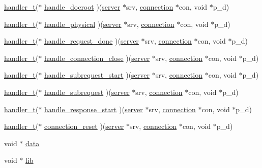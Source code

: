 \begin{DoxyCompactItemize}
\item 
\hyperlink{settings_8h_a2a8ffc3e29980db202f39ab85ab7e98e}{handler\-\_\-t}($\ast$ \hyperlink{structplugin_ac6e9dddb37aca959bd90651e949d5f4d}{handle\-\_\-docroot} )(\hyperlink{structserver}{server} $\ast$srv, \hyperlink{structconnection}{connection} $\ast$con, void $\ast$p\-\_\-d)
\item 
\hyperlink{settings_8h_a2a8ffc3e29980db202f39ab85ab7e98e}{handler\-\_\-t}($\ast$ \hyperlink{structplugin_ae5818db20f5d464df84a4c8bf4354567}{handle\-\_\-physical} )(\hyperlink{structserver}{server} $\ast$srv, \hyperlink{structconnection}{connection} $\ast$con, void $\ast$p\-\_\-d)
\item 
\hyperlink{settings_8h_a2a8ffc3e29980db202f39ab85ab7e98e}{handler\-\_\-t}($\ast$ \hyperlink{structplugin_af9d117621289c84a7cb0d705dbc9f47b}{handle\-\_\-request\-\_\-done} )(\hyperlink{structserver}{server} $\ast$srv, \hyperlink{structconnection}{connection} $\ast$con, void $\ast$p\-\_\-d)
\item 
\hyperlink{settings_8h_a2a8ffc3e29980db202f39ab85ab7e98e}{handler\-\_\-t}($\ast$ \hyperlink{structplugin_ab59fbc651a4308ac4e89ed27d1d33a00}{handle\-\_\-connection\-\_\-close} )(\hyperlink{structserver}{server} $\ast$srv, \hyperlink{structconnection}{connection} $\ast$con, void $\ast$p\-\_\-d)
\item 
\hyperlink{settings_8h_a2a8ffc3e29980db202f39ab85ab7e98e}{handler\-\_\-t}($\ast$ \hyperlink{structplugin_ae99ea16bdd683b294f3017490fd1e63f}{handle\-\_\-subrequest\-\_\-start} )(\hyperlink{structserver}{server} $\ast$srv, \hyperlink{structconnection}{connection} $\ast$con, void $\ast$p\-\_\-d)
\item 
\hyperlink{settings_8h_a2a8ffc3e29980db202f39ab85ab7e98e}{handler\-\_\-t}($\ast$ \hyperlink{structplugin_abf5ea22c50c0dc4ef11047565fbfc9a5}{handle\-\_\-subrequest} )(\hyperlink{structserver}{server} $\ast$srv, \hyperlink{structconnection}{connection} $\ast$con, void $\ast$p\-\_\-d)
\item 
\hyperlink{settings_8h_a2a8ffc3e29980db202f39ab85ab7e98e}{handler\-\_\-t}($\ast$ \hyperlink{structplugin_a2a517137ba9b9e231e97cceef3f41d5e}{handle\-\_\-response\-\_\-start} )(\hyperlink{structserver}{server} $\ast$srv, \hyperlink{structconnection}{connection} $\ast$con, void $\ast$p\-\_\-d)
\item 
\hyperlink{settings_8h_a2a8ffc3e29980db202f39ab85ab7e98e}{handler\-\_\-t}($\ast$ \hyperlink{structplugin_a5c3bbcff69dfdf5c591c0a420b38c055}{connection\-\_\-reset} )(\hyperlink{structserver}{server} $\ast$srv, \hyperlink{structconnection}{connection} $\ast$con, void $\ast$p\-\_\-d)
\item 
void $\ast$ \hyperlink{structplugin_aa5c0338878875f24bcaf3bb4e3f60bc6}{data}
\item 
void $\ast$ \hyperlink{structplugin_ab8a4a02c20d1fa7be51580e5c7584998}{lib}
\end{DoxyCompactItemize}


